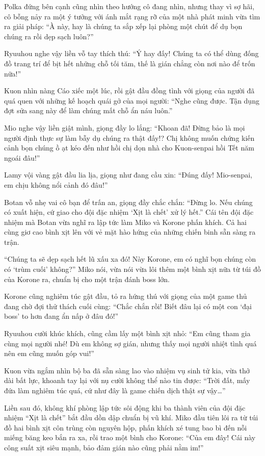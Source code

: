 \documentclass[../main.tex]{subfiles}
\begin{document}
Polka đứng bên cạnh cũng nhìn theo hướng cô đang nhìn, nhưng thay vì sợ hãi, cô bỗng nảy ra một ý tưởng với ánh mắt rạng rỡ của một nhà phát minh vừa tìm ra giải pháp: ``À này, hay là chúng ta sắp xếp lại phòng một chút để dụ bọn chúng ra rồi dẹp sạch luôn?''

Ryuuhou nghe vậy liền vỗ tay thích thú: ``Ý hay đấy! Chúng ta có thể dùng đống đồ trang trí để bịt hết những chỗ tối tăm, thế là gián chẳng còn nơi nào để trốn nữa!''

Kuon nhìn nàng Cáo xiếc một lúc, rồi gật đầu đồng tình với giọng của người đã quá quen với những kế hoạch quái gở của mọi người: ``Nghe cũng được. Tận dụng đợt sửa sang này để làm chúng mất chỗ ẩn náu luôn.''

Mio nghe vậy liền giật mình, giọng đầy lo lắng: ``Khoan đã! Đừng bảo là mọi người định thực sự làm bẫy dụ chúng ra thật đấy!? Chị không muốn chứng kiến cảnh bọn chúng ồ ạt kéo đến như hồi chị dọn nhà cho Kuon-senpai hồi Tết năm ngoái đâu!''

Lamy vội vàng gật đầu lia lịa, giọng như đang cầu xin: ``Đúng đấy! Mio-senpai, em chịu không nổi cảnh đó đâu!''

Botan vỗ nhẹ vai cô bạn để trấn an, giọng đầy chắc chắn: ``Đừng lo. Nếu chúng có xuất hiện, cứ giao cho đội đặc nhiệm `Xịt là chết' xử lý hết.'' Cái tên đội đặc nhiệm mà Botan vừa nghĩ ra lập tức làm Miko và Korone phấn khích. Cả hai cùng giơ cao bình xịt lên với vẻ mặt hào hứng của những chiến binh sẵn sàng ra trận.

``Chúng ta sẽ dẹp sạch hết lũ xấu xa đó! Này Korone, em có nghĩ bọn chúng còn có `trùm cuối' không?'' Miko nói, vừa nói vừa lôi thêm một bình xịt nữa từ túi đồ của Korone ra, chuẩn bị cho một trận đánh boss lớn.

Korone cũng nghiêm túc gật đầu, tỏ ra hứng thú với giọng của một game thủ đang chờ đợi thử thách cuối cùng: ``Chắc chắn rồi! Biết đâu lại có một con `đại boss' to hơn đang ẩn nấp ở đâu đó!''

Ryuuhou cười khúc khích, cũng cầm lấy một bình xịt nhỏ: ``Em cũng tham gia cùng mọi người nhé! Dù em không sợ gián, nhưng thấy mọi người nhiệt tình quá nên em cũng muốn góp vui!''

Kuon vừa ngắm nhìn bộ ba đã sẵn sàng lao vào nhiệm vụ sinh tử kia, vừa thở dài bất lực, khoanh tay lại với nụ cười không thể nào tin được: ``Trời đất, mấy đứa làm nghiêm túc quá, cứ như đây là game chiến dịch thật sự vậy\dots''

Liền sau đó, không khí phòng lập tức sôi động khi ba thành viên của đội đặc nhiệm ``Xịt là chết'' bắt đầu dồn dập chuẩn bị vũ khí. Miko đầu tiên lôi ra từ túi đồ hai bình xịt côn trùng còn nguyên hộp, phấn khích xé tung bao bì đến nỗi miếng băng keo bắn ra xa, rồi trao một bình cho Korone: ``Của em đây! Cái này công suất xịt siêu mạnh, bảo đảm gián nào cũng phải nằm im!''
\end{document}
